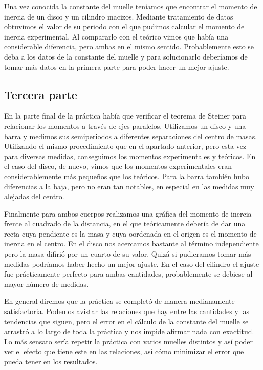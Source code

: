 \documentclass[12pt, a4paper, titlepage]{article}
\begin{document}
  Una vez conocida la constante del muelle teníamos que encontrar el momento de inercia de un disco y un cilindro macizos. Mediante tratamiento de datos obtuvimos el valor de su periodo con el que pudimos calcular el momento de inercia experimental. Al compararlo con el teórico vimos que había una considerable diferencia, pero ambas en el mismo sentido. Probablemente esto se deba a los datos de la constante del muelle y para solucionarlo deberíamos de tomar más datos en la primera parte para poder hacer un mejor ajuste.

  \subsection{Tercera parte}

  En la parte final de la práctica había que verificar el teorema de Steiner para relacionar los momentos a través de ejes paralelos. Utilizamos un disco y una barra y medimos sus semiperiodos a diferentes separaciones del centro de masas. Utilizando el mismo procedimiento que en el apartado anterior, pero esta vez para diversas medidas, conseguimos los momentos experimentales y teóricos. En el caso del disco, de nuevo, vimos que los momentos experimentales eran considerablemente más pequeños que los teóricos. Para la barra también hubo diferencias a la baja, pero no eran tan notables, en especial en las medidas muy alejadas del centro.

  Finalmente para ambos cuerpos realizamos una gráfica del momento de inercia frente al cuadrado de la distancia, en el que teóricamente debería de dar una recta cuya pendiente es la masa y cuya oordenada en el origen es el momento de inercia en el centro. En el disco nos acercamos bastante al término independiente pero la masa difirió por un cuarto de su valor. Quizá si pudieramos tomar más medidas podríamos haber hecho un mejor ajuste. En el caso del cilindro el ajuste fue prácticamente perfecto para ambas cantidades, probablemente se debiese al mayor número de medidas.

  En general diremos que la práctica se completó de manera medianamente satisfactoria. Podemos avistar las relaciones que hay entre las cantidades y las tendencias que siguen, pero el error en el cálculo de la constante del muelle se arrastró a lo largo de toda la práctica y nos impide afirmar nada con exactitud. Lo más sensato sería repetir la práctica con varios muelles distintos y así poder ver el efecto que tiene este en las relaciones, así cómo minimizar el error que pueda tener en los resultados.
\end{document}
